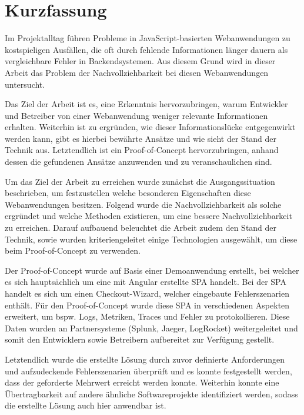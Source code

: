 \section*{\thispagestyle{empty}Kurzfassung}
	
Im Projektalltag führen Probleme in JavaScript-basierten Webanwendungen zu kostspieligen Ausfällen, die oft durch fehlende Informationen länger dauern als vergleichbare Fehler in Backendsystemen. Aus diesem Grund wird in dieser Arbeit das Problem der Nachvollziehbarkeit bei diesen Webanwendungen untersucht.
	
Das Ziel der Arbeit ist es, eine Erkenntnis hervorzubringen, warum Entwickler und Betreiber von einer Webanwendung weniger relevante Informationen erhalten. Weiterhin ist zu ergründen, wie dieser Informationslücke entgegenwirkt werden kann, gibt es hierbei bewährte Ansätze und wie sieht der Stand der Technik aus. Letztendlich ist ein Proof-of-Concept hervorzubringen, anhand dessen die gefundenen Ansätze anzuwenden und zu veranschaulichen sind.

Um das Ziel der Arbeit zu erreichen wurde zunächst die Ausgangssituation beschrieben, um festzustellen welche besonderen Eigenschaften diese Webanwendungen besitzen. Folgend wurde die Nachvollziehbarkeit als solche ergründet und welche Methoden existieren, um eine bessere Nachvollziehbarkeit zu erreichen. Darauf aufbauend beleuchtet die Arbeit zudem den Stand der Technik, sowie wurden kriteriengeleitet einige Technologien ausgewählt, um diese beim Proof-of-Concept zu verwenden.

Der Proof-of-Concept wurde auf Basis einer Demoanwendung erstellt, bei welcher es sich hauptsächlich um eine mit Angular erstellte SPA handelt. Bei der SPA handelt es sich um einen Checkout-Wizard, welcher eingebaute Fehlerszenarien enthält. Für den Proof-of-Concept wurde diese SPA in verschiedenen Aspekten erweitert, um bspw. Logs, Metriken, Traces und Fehler zu protokollieren. Diese Daten wurden an Partnersysteme (Splunk, Jaeger, LogRocket) weitergeleitet und somit den Entwicklern sowie Betreibern aufbereitet zur Verfügung gestellt.

Letztendlich wurde die erstellte Lösung durch zuvor definierte Anforderungen und aufzudeckende Fehlerszenarien überprüft und es konnte festgestellt werden, dass der geforderte Mehrwert erreicht werden konnte. Weiterhin konnte eine Übertragbarkeit auf andere ähnliche Softwareprojekte identifiziert werden, sodass die erstellte Lösung auch hier anwendbar ist.

